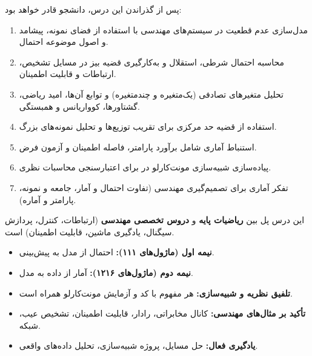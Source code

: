 
پس از گذراندن این درس، دانشجو قادر خواهد بود:

\begin{enumerate}
\def\labelenumi{\arabic{enumi}.}
\tightlist
\item
  مدل‌سازی عدم قطعیت در سیستم‌های مهندسی با استفاده از فضای نمونه، پیشامد و اصول موضوعه احتمال.
\item
  محاسبه احتمال شرطی، استقلال و به‌کارگیری قضیه بیز در مسایل تشخیص، ارتباطات و قابلیت اطمینان.
\item
  تحلیل متغیرهای تصادفی (یک‌متغیره و چندمتغیره) و توابع آن‌ها، امید ریاضی، گشتاورها، کوواریانس و همبستگی.
\item
  استفاده از قضیه حد مرکزی برای تقریب توزیع‌ها و تحلیل نمونه‌های بزرگ.
\item
  استنباط آماری شامل برآورد پارامتر، فاصله اطمینان و آزمون فرض.
\item
  پیاده‌سازی شبیه‌سازی مونت‌کارلو در  برای اعتبارسنجی محاسبات نظری.
\item
  تفکر آماری برای تصمیم‌گیری مهندسی  (تفاوت احتمال و آمار، جامعه و نمونه، پارامتر و آماره).
\end{enumerate}


این درس پل بین \textbf{ریاضیات پایه} و \textbf{دروس تخصصی مهندسی} (ارتباطات، کنترل، پردازش سیگنال، یادگیری ماشین، قابلیت اطمینان) است.

\begin{itemize}
\tightlist
\item
  \textbf{نیمه اول (ماژول‌های ۱۱۱):} احتمال  از مدل به پیش‌بینی.
\item
  \textbf{نیمه دوم (ماژول‌های ۱۲۱۶):} آمار  از داده به مدل.
\end{itemize}


\begin{itemize}
\tightlist
\item
  \textbf{تلفیق نظریه و شبیه‌سازی:} هر مفهوم با کد  و آزمایش مونت‌کارلو همراه است.
\item
  \textbf{تأکید بر مثال‌های مهندسی:} کانال مخابراتی، رادار، قابلیت اطمینان، تشخیص عیب، شبکه.
\item
  \textbf{یادگیری فعال:} حل مسایل، پروژه شبیه‌سازی، تحلیل داده‌های واقعی.
\end{itemize}

